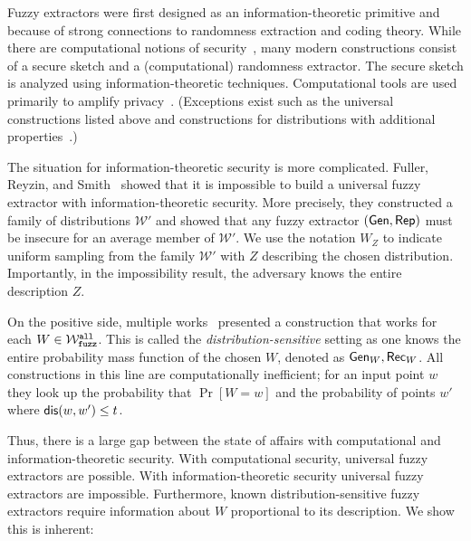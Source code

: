 Fuzzy extractors were first designed as an information-theoretic primitive and because of strong connections to randomness extraction and coding theory.  While there are computational notions of security~\cite{fuller2020computational}, many modern constructions consist of a secure sketch and a (computational) randomness extractor.  The secure sketch is analyzed using information-theoretic techniques.  Computational tools are used primarily to amplify privacy~\cite{wen2018robustly,wen2019generic}.  (Exceptions exist such as the universal constructions listed above and constructions for distributions with additional properties~\cite{apon2017efficient,alamelou2018pseudoentropic,fuller2020computational,canetti2021reusable}.)

The situation for information-theoretic security is more complicated.  Fuller, Reyzin, and Smith~\cite{fuller2020fuzzy} showed that it is impossible to build a universal fuzzy extractor with information-theoretic security.  More precisely, they constructed a family of distributions $\mathcal{W}'$ and showed that any fuzzy extractor $({\mathsf{Gen}}, {\mathsf{Rep}})$ must be insecure for an average member of $\mathcal{W}'$. We use the notation $W_Z$ to indicate uniform sampling from the family $\mathcal{W}'$ with $Z$ describing the chosen distribution.  Importantly, in the impossibility result, the adversary knows the entire description $Z$.

On the positive side, multiple works~\cite{hayashi2014secret,hayashi2016secret,fuller2016fuzzy,woodage2017new,tyagi2017universal,TVW18,LA18,fuller2019continuous,fuller2020fuzzy} presented a construction that works for each $W\in \mathcal{W}_{\mathtt{fuzz}}^{\mathtt{all}}$.  This is called the \emph{distribution-sensitive} setting as one knows the entire probability mass function of the chosen $W$, denoted as ${\mathsf{Gen}}_W, {\mathsf{Rec}}_W$.  All constructions in this line are computationally inefficient; for an input point $w$ they look up the probability that $\Pr[W=w]$ and the probability of points $w'$ where $\mathsf{dis}(w, w')\le t$.  

Thus, there is a large gap between the state of affairs with computational and information-theoretic security.  With computational security, universal fuzzy extractors are possible.  With information-theoretic security universal fuzzy extractors are impossible.  Furthermore, known distribution-sensitive fuzzy extractors require information about $W$ proportional to its description.  We show this is inherent:

